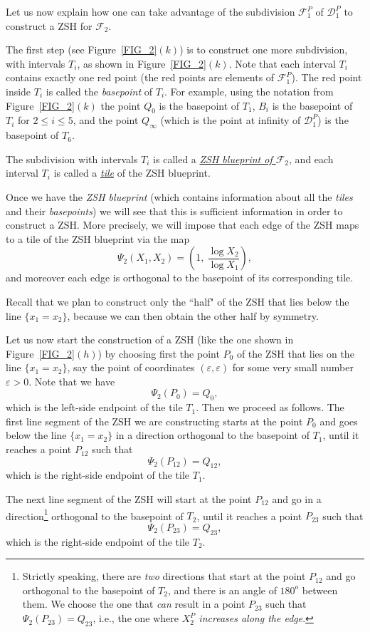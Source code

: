 \documentclass[12pt,letterpaper]{article}
\newcommand{\D}{\mathcal{D}}
\newcommand{\F}{\mathcal{F}}
\newcommand{\eps}{\varepsilon}
\begin{document}
\bigskip






Let us now explain how one can take advantage of the subdivision $\F_1^P$ of  $\D_1^P$ to construct a ZSH for $\F_2$. 

The first step (see Figure~\ref{FIG_2}$(k)$) is to construct one more subdivision, with intervals $T_i$, as shown in Figure~\ref{FIG_2}$(k)$. Note that each interval $T_i$ contains exactly one red point (the red points are elements of $\F_1^P$). The red point inside $T_i$ is called the {\em basepoint} of $T_i$. For example, using the notation from Figure~\ref{FIG_2}$(k)$ the point $Q_0$ is the basepoint of $T_1$, $B_i$ is the basepoint of $T_i$ for $2 \le i \le 5$, and the point $Q_\infty$ (which is the point at infinity of $\D_1^P$) is the basepoint of $T_6$.

The subdivision with intervals $T_i$ is called a \underline{\em ZSH blueprint of $\F_2$}, and each interval $T_i$ is called a \underline{\em tile} of the ZSH blueprint.

Once we have the {\em ZSH blueprint} (which contains information about all the {\em tiles} and their {\em basepoints}) we will see that this is sufficient information in order to construct  a ZSH. More precisely, we will impose that each edge of the ZSH  maps to a tile of the ZSH blueprint via the map
%
$$
\Psi_2(X_1, X_2) = \left( 1, \ \frac{\log X_2}{\log X_1} \right),
$$
%
and moreover each edge is orthogonal to the basepoint of its corresponding  tile. 


Recall that we plan to construct only the ``half" of the ZSH that lies below the line $\{ x_1=x_2 \}$, because we can then obtain the other half by symmetry. 

Let us now start the construction of a ZSH (like the one shown in Figure~\ref{FIG_2}$(h)$) by choosing first the point $P_0$ of the ZSH that lies on the line $\{ x_1 = x_2 \}$, say the point of coordinates $(\varepsilon, \varepsilon)$ for some very small number $\eps > 0$. 
Note that we have 
$$
\Psi_2(P_0) = Q_0,
$$ 
which is the left-side endpoint of the tile $T_1$. Then we proceed as follows. The first line segment of the ZSH we are constructing starts at the point $P_0$ and goes below the line $\{ x_1 = x_2 \}$ in a direction orthogonal to the basepoint of $T_1$, until it reaches a point $P_{12}$ such that 
$$
\Psi_2(P_{12}) = Q_{12},
$$
which is the right-side endpoint of the tile $T_1$. 

The next line segment of the ZSH will start at the point $P_{12}$ and go in a direction\footnote{Strictly speaking, there are {\em two} directions that start at the point $P_{12}$ and go orthogonal to the basepoint of $T_2$, and there is an angle of $180^o$ between them. We choose the one that {\em can} result in a point $P_{23}$ such that $\Psi_2(P_{23}) = Q_{23}$, i.e., the one where {\em $X_2^P$ increases along the edge}.} orthogonal to the basepoint of $T_2$, until it reaches  a point $P_{23}$ such that 
$$
\Psi_2(P_{23}) = Q_{23},
$$
which is the right-side endpoint of the tile $T_2$. 
\end{document}

